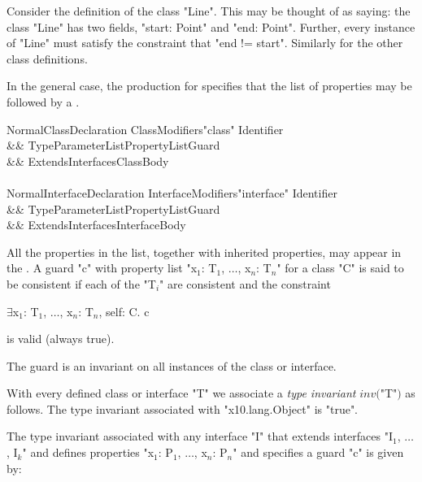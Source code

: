 Consider the definition of the class \xcd"Line". This may be thought of as
saying: the class \xcd"Line" has two fields, \xcd"start: Point" and
\xcd"end: Point".
Further, every instance of \xcd"Line" must satisfy the constraint that
\xcd"end != start". Similarly for the other class definitions. 

In the general case, the production for 
specifies that the list of properties may be followed by a
.

\begin{grammar}
NormalClassDeclaration \:
      ClassModifiers\opt \xcd"class" Identifier  \\
   && TypeParameterList\opt PropertyList\opt Guard\opt \\
   && Extends\opt Interfaces\opt ClassBody \\
\\
NormalInterfaceDeclaration \:
      InterfaceModifiers\opt \xcd"interface" Identifier  \\
   && TypeParameterList\opt PropertyList\opt Guard\opt \\
   && ExtendsInterfaces\opt InterfaceBody \\
\end{grammar}

All the properties in the list, together with inherited properties,
may appear in the . A guard \xcd"c" with
property list \xcdmath"x$_1$: T$_1$, $\dots$, x$_n$: T$_n$"
for a class \xcd"C" is said to be consistent if each of the \xcdmath"T$_i$" are
consistent and the constraint
\begin{xtenmath}
$\exists$x$_1$: T$_1$, $\dots$, x$_n$: T$_n$, self: C. c
\end{xtenmath}
\noindent is valid (always true).

\label{DepType:TypeInvariant}
\label{DepType:ClassGuardDef}

The guard is an invariant on all instances of the class or interface.

With every defined class or interface \xcd"T" we associate a {\em type
invariant} $\mathit{inv}($\xcd"T"$)$ as follows. The type
invariant associated with \xcd"x10.lang.Object" is 
\xcd"true".

The type invariant associated with any interface \xcd"I" that extends
interfaces \xcdmath"I$_1$, $\dots$, I$_k$" and defines properties
\xcdmath"x$_1$: P$_1$, $\dots$, x$_n$: P$_n$" and
specifies a guard \xcd"c" is given by:

